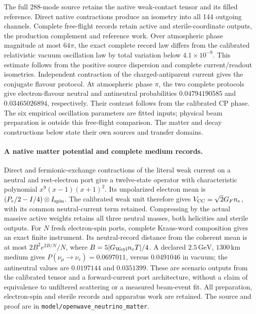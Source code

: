 The full 288-mode source retains the native weak-contact tensor and its filled reference. Direct native contractions produce an isometry into all 144 outgoing channels. Complete free-flight records retain active and sterile-coordinate outputs, the production complement and reference work. Over atmospheric phase magnitude at most $64\pi$, the exact complete record law differs from the calibrated relativistic vacuum oscillation law by total variation below $4.1\times10^{-9}$. This estimate follows from the positive source dispersion and complete current/readout isometries. Independent contraction of the charged-antiparent current gives the conjugate flavour protocol. At atmospheric phase $\pi$, the two complete protocols give electron-flavour neutral and antineutral probabilities $0.04794190585$ and $0.03465026894$, respectively. Their contrast follows from the calibrated CP phase. The six empirical oscillation parameters are fitted inputs; physical beam preparation is outside this free-flight comparison. The matter and decay constructions below state their own sources and transfer domains.


\paragraph{A native matter potential and complete medium records.}
Direct and fermionic-exchange contractions of the literal weak current
on a neutral and rest-electron port give a twelve-state operator with
characteristic polynomial \(x^9(x-1)(x+1)^2\). Its unpolarized electron
mean is \((P_e/2-I/4)\otimes I_{\rm spin}\). The calibrated weak unit
therefore gives \(V_{\rm CC}=\sqrt2G_F n_e\), with its common neutral-current
term retained. Compressing by the actual massive active weights retains
all three neutral masses, both helicities and sterile outputs.
For \(N\) fresh electron-spin ports, complete Kraus-word composition gives
an exact finite instrument. Its neutral-record distance from the coherent
mean is at most \(2B^2e^{2B/N}/N\), where
\(B=5|G_{\rm Weyl}n_eT|/4\).
A declared \(2.5\,\mathrm{GeV}\), \(1300\,\mathrm{km}\) medium gives
\(P(\nu_\mu\to\nu_e)=0.0697011\), versus \(0.0491046\) in vacuum;
the antineutral values are \(0.0197144\) and \(0.0351399\).
These are scenario outputs from the calibrated tensor and a forward-current
port architecture, without a claim of equivalence to unfiltered scattering
or a measured beam-event fit. All preparation, electron-spin and sterile
records and apparatus work are retained. The source and proof are in
\texttt{model/openwave\_neutrino\_matter}.

